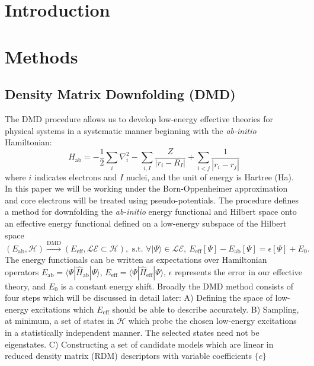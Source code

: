 \documentclass{article}
\begin{document}
\section{Introduction}

\section{Methods}
\subsection{Density Matrix Downfolding (DMD)}
The DMD procedure allows us to develop low-energy effective theories for physical systems in a systematic manner beginning with the \textit{ab-initio} Hamiltonian:
\begin{equation}
\hat{H}_\text{ab} = -\frac{1}{2} \sum_{i} \nabla_i^2 - \sum_{i,I}\frac{Z}{|r_i - R_I|} + \sum_{i<j}\frac{1}{|r_i - r_j|}
\label{eq:Hab}
\end{equation}
where $i$ indicates electrons and $I$ nuclei, and the unit of energy is Hartree (Ha).
In this paper we will be working under the Born-Oppenheimer approximation and core electrons will be treated using pseudo-potentials.
The procedure defines a method for downfolding the \textit{ab-initio} energy functional and Hilbert space onto an effective energy functional defined on a low-energy subspace of the Hilbert space 
\begin{equation}
(E_\text{ab}, \mathcal{H}) \xrightarrow{\text{DMD}} (E_\text{eff}, \mathcal{LE} \subset \mathcal{H}), \text{ s.t. }
\forall |\Psi\rangle \in \mathcal{LE}, \ E_\text{eff}[\Psi] - E_\text{ab}[\Psi] = \epsilon[\Psi] + E_0.
\label{eq:DMD}
\end{equation} 
The energy functionals can be written as expectations over Hamiltonian operators $E_\text{ab} = \langle \Psi | \hat{H}_\text{ab} |\Psi \rangle$, $E_\text{eff} = \langle \Psi | \hat{H}_\text{eff} |\Psi \rangle$, $\epsilon$ represents the error in our effective theory, and $E_0$ is a constant energy shift.
Broadly the DMD method consists of four steps which will be discussed in detail later: 
A) Defining the space of low-energy excitations which $E_\text{eff}$ should be able to describe accurately.
B) Sampling, at minimum, a set of states in $\mathcal{H}$ which probe the chosen low-energy excitations in a statistically independent manner. The selected states need not be eigenstates. 
C) Constructing a set of candidate models which are linear in reduced density matrix (RDM) descriptors with variable coefficients $\{c\}$
\end{document}
